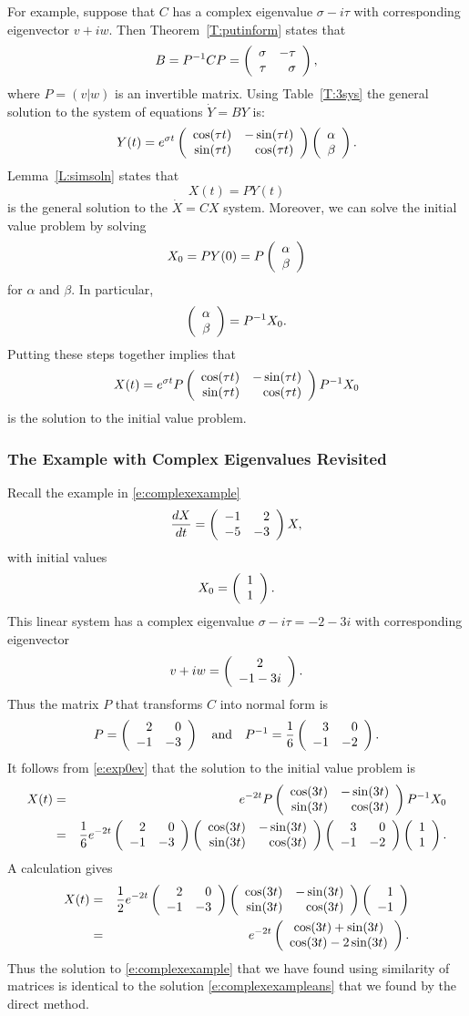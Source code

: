 \documentclass{ximera}
\begin{document}
For example, suppose that $C$ has a complex eigenvalue $\sigma-i\tau$ with
corresponding eigenvector $v+iw$.  Then Theorem~\ref{T:putinform} states that
\[
B = P^{-1} CP = \left(\begin{array}{rr} \sigma & -\tau\\ \tau &\sigma\end{array}\right),
\]
where $P=(v|w)$ is an invertible matrix.  Using Table~\ref{T:3sys} the
general solution to the system of equations $\dot{Y}=BY$ is:
\[
Y(t) = e^{\sigma t}
\left(\begin{array}{rr} \cos(\tau t) & -\sin(\tau t)\\ \sin(\tau t) &\cos(\tau t)\end{array}\right)
\left(\begin{array}{r} \alpha \\ \beta\end{array}\right).
\]
Lemma~\ref{L:simsoln} states that
\[
X(t) = PY(t)
\]
is the general solution to the $\dot{X}=CX$ system.  Moreover, we can solve
the initial value problem by solving
\[
X_0 = PY(0) = P\left(\begin{array}{r} \alpha \\ \beta\end{array}\right)
\]
for $\alpha$ and $\beta$.  In particular,
\[
\left(\begin{array}{r} \alpha \\ \beta\end{array}\right) = P^{-1} X_0.
\]
Putting these steps together implies that
\begin{equation} \label{e:exp0ev}
X(t) = e^{\sigma t}
P\left(\begin{array}{rr} \cos(\tau t) & -\sin(\tau t)\\ \sin(\tau t) &\cos(\tau t)\end{array}\right)P^{-1} X_0
\end{equation}
is the solution to the initial value problem.

\subsubsection*{The Example with Complex Eigenvalues Revisited}

Recall the example in \eqref{e:complexexample}
\[
\frac{dX}{dt} = \left(\begin{array}{rr} -1 & 2\\ -5 &-3\end{array}\right) X,
\]
with initial values
\[
X_0=\left(\begin{array}{r} 1 \\ 1\end{array}\right).
\]
This linear system has a complex eigenvalue $\sigma-i\tau=-2-3i$ with
corresponding eigenvector
\[
v+iw = \left(\begin{array}{c} 2 \\ -1-3i\end{array}\right).
\]
Thus the matrix $P$ that transforms $C$ into normal form is
\[
P = \left(\begin{array}{rr} 2 & 0\\ -1 &-3\end{array}\right) \quad\mbox{and}\quad P^{-1} = \frac{1}{6}\left(\begin{array}{rr} 3 & 0\\ -1 &-2\end{array}\right).
\]
It follows from \eqref{e:exp0ev} that the solution to the initial value problem
is
{\scriptsize \begin{eqnarray*}
X(t) & =  &
e^{-2t}P\left(\begin{array}{rr} \cos(3t) & -\sin(3t)\\ \sin(3t) &\cos(3t)\end{array}\right)P^{-1} X_0 \\ & = &
\frac{1}{6}e^{-2t}\left(\begin{array}{rr} 2 & 0\\ -1 &-3\end{array}\right)
\left(\begin{array}{rr} \cos(3t) & -\sin(3t)\\ \sin(3t) &\cos(3t)\end{array}\right)
\left(\begin{array}{rr} 3 & 0\\ -1 &-2\end{array}\right)\left(\begin{array}{r} 1 \\ 1\end{array}\right).
\end{eqnarray*}\normalsize}
A calculation gives
{\scriptsize\begin{eqnarray*}
X(t) & = & \frac{1}{2}e^{-2t}\left(\begin{array}{rr} 2 & 0\\ -1 &-3\end{array}\right)
\left(\begin{array}{rr} \cos(3t) & -\sin(3t)\\ \sin(3t) &\cos(3t)\end{array}\right)\left(\begin{array}{r} 1 \\ -1\end{array}\right)  \\
& = & e^{-2t}
\left(\begin{array}{c} \cos(3t)+\sin(3t) \\ \cos(3t)-2\sin(3t)\end{array}\right).
\end{eqnarray*}\normalsize}            
Thus the solution to \eqref{e:complexexample} that we have found using 
similarity of matrices is identical to the solution \eqref{e:complexexampleans}
that we found by the direct method.
\end{document}
